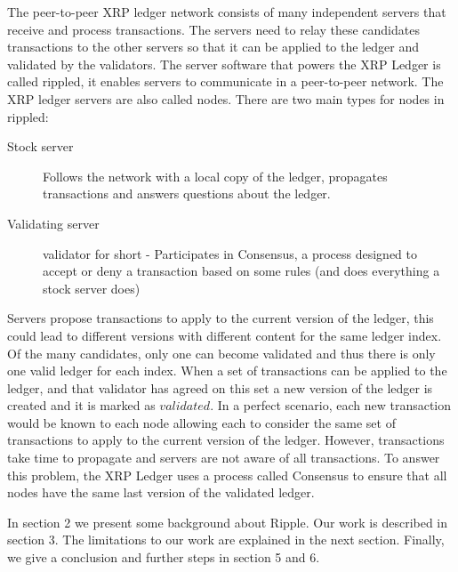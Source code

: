 The peer-to-peer XRP ledger network consists of many independent servers that receive and process transactions. The servers need to relay these candidates transactions to the other servers so that it can be applied to the ledger and validated by the validators. The server software that powers the XRP Ledger is called rippled\cite{rippled}, it enables servers to communicate in a peer-to-peer network.
The XRP ledger servers are also called nodes. There are two main types for nodes in rippled:
\begin{description}
\item[Stock server] Follows the network with a local copy of the ledger, propagates transactions and answers questions about the ledger.
\item[Validating server] validator for short - Participates in Consensus, a process designed to accept or deny a transaction based on some rules (and does everything a stock server does)
\end{description}
Servers propose transactions to apply to the current version of the ledger, this could lead to different versions with different content for the same ledger index. Of the many candidates, only one can become validated and thus there is only one valid ledger for each index. When a set of transactions can be applied to the ledger, and that validator has agreed on this set a new version of the ledger is created and it is marked as $validated$. In a perfect scenario, each new transaction would be known to each node allowing each to consider the same set of transactions to apply to the current version of the ledger. However, transactions take time to propagate and servers are not aware of all transactions. To answer this problem, the XRP Ledger uses a process called Consensus to ensure that all nodes have the same last version of the validated ledger.
\vspace{\baselineskip}

In section 2 we present some background about Ripple. Our work is described in section 3. The limitations to our work are explained in the next section. Finally, we give a conclusion and further steps in section 5 and 6.

